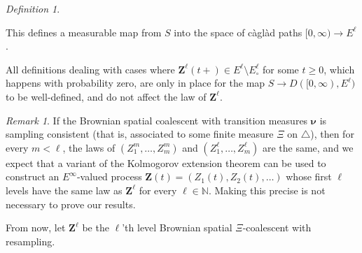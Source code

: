 \documentclass[reqno,draft]{amsart}
\numberwithin{equation}{section}
\theoremstyle{plain}
\theoremstyle{remark}
\newtheorem{remark}[theorem]{Remark}
\newtheorem{definition}[theorem]{Definition}
\newcommand{\N}{\mathbb{N}} %
\newcommand{\fpart}{\Pi} %
\begin{document}
\begin{definition}
\begin{enumerate}
\begin{enumerate}
            \end{enumerate}
    \end{enumerate}
    This defines a measurable map from $S$ into the space of c\`agl\`ad paths $[0,\infty)\to E^\ell$.
\end{definition}

All definitions dealing with cases where $\boldsymbol Z^\ell(t+) \in E^\ell\setminus E^\ell_\circ $ for some $t \ge 0$, which happens with probability zero, are only in place for the map $S \to D([0,\infty),E^\ell)$ to be well-defined, and do not affect the law of $\boldsymbol Z^\ell$.

\begin{remark}
    If the Brownian spatial coalescent with transition measures $\boldsymbol \nu$ is sampling consistent (that is, associated to some finite measure $\Xi$ on $\triangle$), then for every $m < \ell$, the laws of $(Z^m_1, \ldots ,Z^m_m)$ and $(Z^\ell_1, \ldots ,Z^\ell_m)$ are the same, and we expect that a variant of the Kolmogorov extension theorem can be used to construct an $E^\infty$-valued process $\boldsymbol Z(t) = (Z_1(t),Z_2(t),\ldots )$ whose first $\ell$ levels have the same law as $\boldsymbol Z^\ell$ for every $\ell\in \N$. Making this precise is not necessary to prove our results.
\end{remark}

From now, let $\boldsymbol Z^\ell$ be the $\ell$'th level Brownian spatial $\Xi$-coalescent with resampling.
\end{document}
